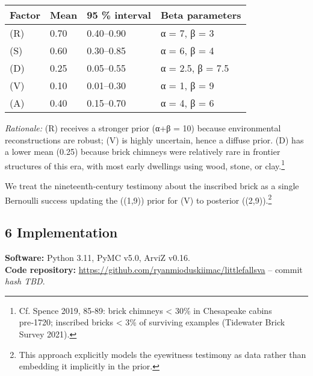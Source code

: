 \documentclass[
  11pt,
]{article}
\begin{document}
\begin{longtable}[]{@{}llll@{}}
\toprule\noalign{}
Factor & Mean & 95 \% interval & Beta parameters \\
\midrule\noalign{}
\endhead
\bottomrule\noalign{}
\endlastfoot
(R) & 0.70 & 0.40--0.90 & α = 7, β = 3 \\
(S) & 0.60 & 0.30--0.85 & α = 6, β = 4 \\
(D) & 0.25 & 0.05--0.55 & α = 2.5, β = 7.5 \\
(V) & 0.10 & 0.01--0.30 & α = 1, β = 9 \\
(A) & 0.40 & 0.15--0.70 & α = 4, β = 6 \\
\end{longtable}

\emph{Rationale:} (R) receives a stronger prior (α+β = 10) because
environmental reconstructions are robust; (V) is highly uncertain, hence
a diffuse prior. (D) has a lower mean (0.25) because brick chimneys were
relatively rare in frontier structures of this era, with most early
dwellings using wood, stone, or clay.\footnote{Cf. Spence 2019, 85‑89:
  brick chimneys \textless{} 30\% in Chesapeake cabins pre‑1720;
  inscribed bricks \textless{} 3\% of surviving examples (Tidewater
  Brick Survey 2021).}

We treat the nineteenth-century testimony about the inscribed brick as a
single Bernoulli success updating the ((1,9)) prior for (V)
to posterior ((2,9)).\footnote{This approach explicitly
  models the eyewitness testimony as data rather than embedding it
  implicitly in the prior.}

\subsection{6 Implementation}\label{implementation}

\textbf{Software:} Python 3.11, PyMC v5.0, ArviZ v0.16.\\
\textbf{Code repository:}
\url{https://github.com/ryanmioduskiimac/littlefallsva} -- commit
\emph{hash TBD}.
\end{document}
